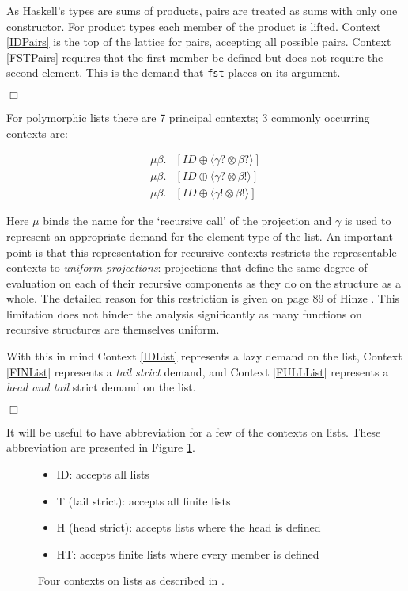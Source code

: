 As Haskell's types are sums of products, pairs are treated as sums with only
one constructor.  For product types each member of the product is lifted.
Context \ref{IDPairs} is the top of the lattice for pairs, accepting all
possible pairs. Context \ref{FSTPairs} requires that the first member be
defined but does not require the second element. This is the demand that
\verb-fst- places on its argument.

\hfill$\Box$

For polymorphic lists there are 7 principal contexts; 3 commonly occurring contexts are:

\begin{align}
    \mu\beta.&[ID \oplus \langle \gamma? \otimes \beta?\rangle] \label{IDList} \\
    \mu\beta.&[ID \oplus \langle \gamma? \otimes \beta!\rangle] \label{FINList} \\
    \mu\beta.&[ID \oplus \langle \gamma! \otimes \beta!\rangle] \label{FULLList}
\end{align}


Here $\mu$ binds the name for the `recursive call' of the projection and
$\gamma$ is used to represent an appropriate demand for the element type of the
list.  An important point is that this representation for recursive contexts
restricts the representable contexts to \emph{uniform projections}: projections
that define the same degree of evaluation on each of their recursive components
as they do on the structure as a whole. The detailed reason for this
restriction is given on page 89 of Hinze \citep{hinze1995projection}. This
limitation does not hinder the analysis significantly as many functions on
recursive structures are themselves uniform.

With this in mind Context \ref{IDList} represents a lazy demand on the list,
Context \ref{FINList} represents a \emph{tail strict} demand, and Context
\ref{FULLList} represents a \emph{head and tail} strict demand on the list.

\hfill$\Box$

It will be useful to have abbreviation for a few of the contexts on lists. These
abbreviation are presented in Figure \ref{contexts}.

\begin{figure}[h!]
\begin{itemize}
    \item[] ID: accepts all lists
    \item[] T (tail strict): accepts all finite lists
    \item[] H (head strict): accepts lists where the head is defined
    \item[] HT: accepts finite lists where every member is defined
\end{itemize}
\caption[Projections for the 4-point Domain]{Four contexts on lists as described in \citep{wadler1987projections}.}
\label{contexts}
\end{figure}

